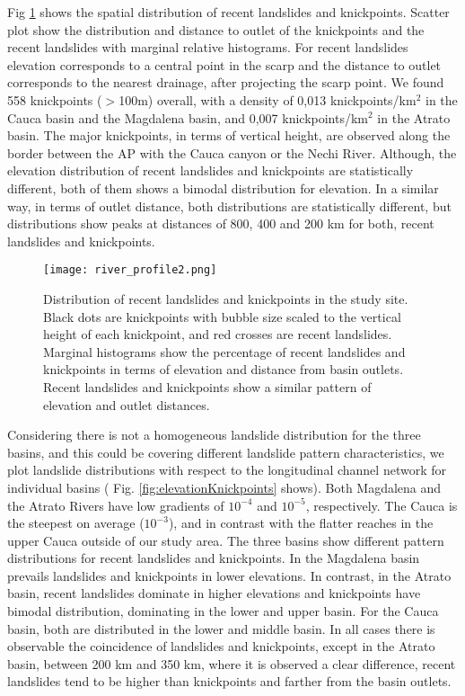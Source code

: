 \documentclass[draft]{agujournal2019}
\begin{document}
\par Fig \ref{fig:profiles} shows the spatial distribution of recent landslides and knickpoints.  Scatter plot show the distribution and distance to outlet of the knickpoints and the recent landslides with marginal relative histograms. For recent landslides elevation corresponds to a central point in the scarp and the distance to outlet corresponds to the nearest drainage, after projecting the scarp point. We found 558 knickpoints ($>$100m) overall, with a density of 0,013 knickpoints/km$^2$ in the Cauca basin and the Magdalena basin, and 0,007 knickpoints/km$^2$ in the Atrato basin. The major knickpoints, in terms of vertical height, are observed along the border between the AP with the Cauca canyon or the Nechi River. Although, the elevation distribution of recent landslides and knickpoints are statistically different, both of them shows a bimodal distribution for elevation. In a similar way, in terms of outlet distance, both distributions are statistically different, but distributions show peaks at distances of 800, 400 and 200 km for both, recent landslides and knickpoints.

\begin{figure}[ht!]
     \centering
        {\texttt{[image: river\_profile2.png]}}
    \caption{Distribution of recent landslides and knickpoints in the study site. Black dots are knickpoints with bubble size scaled to the vertical height of each knickpoint, and red crosses are recent landslides. Marginal histograms show the percentage of recent landslides and knickpoints in terms of elevation and distance from basin outlets. Recent landslides and knickpoints show a similar pattern of elevation and outlet distances.}
  \label{fig:profiles}
\end{figure}

\par Considering there is not a homogeneous landslide distribution for the three basins, and this could be covering different landslide pattern characteristics, we plot landslide distributions with respect to the longitudinal channel network for individual basins ( Fig. \ref{fig:elevationKnickpoints} shows). Both Magdalena and the Atrato Rivers have low gradients of $10^{-4}$ and $10^{-5}$, respectively. The Cauca is the steepest on average ($10^{-3}$), and in contrast with the flatter reaches in the upper Cauca outside of our study area. The three basins show different pattern distributions for recent landslides and knickpoints. In the Magdalena basin prevails landslides and knickpoints in lower elevations. In contrast, in the Atrato basin, recent landslides dominate in higher elevations and knickpoints have bimodal distribution, dominating in the lower and upper basin. For the Cauca basin, both are distributed in the lower and middle basin. In all cases there is observable the coincidence of landslides and knickpoints, except in the Atrato basin, between 200 km and 350 km, where it is observed a clear difference, recent landslides tend to be higher than knickpoints and farther from the basin outlets. 
\end{document}
